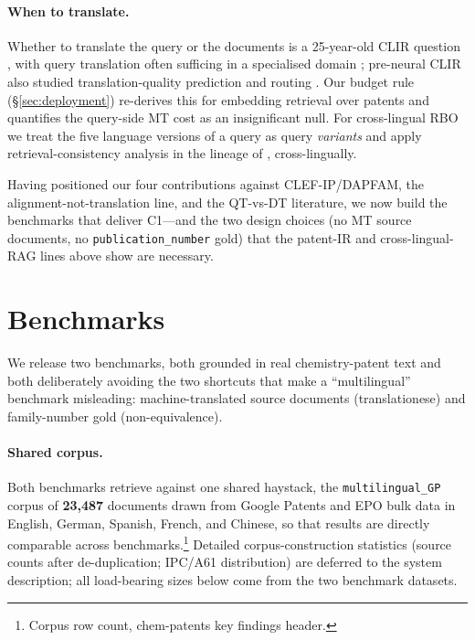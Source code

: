 \documentclass[11pt]{article}
\begin{document}
\paragraph{When to translate.}
Whether to translate the query or the documents is a 25-year-old CLIR question
\citep{oard1998,salehpecina2020}, with query translation often sufficing in a
specialised domain \citep{salehpecina2020}; pre-neural CLIR also studied
translation-quality prediction and routing \citep{kishida2008}. Our budget rule
(\S\ref{sec:deployment}) re-derives this for embedding retrieval over patents
and quantifies the query-side MT cost as an insignificant null. For
cross-lingual RBO we treat the five language versions of a query as query
\emph{variants} and apply retrieval-consistency analysis in the lineage of
\citet{bailey2017consistency}, cross-lingually.

Having positioned our four contributions against CLEF-IP/DAPFAM, the
alignment-not-translation line, and the QT-vs-DT literature, we now build the
benchmarks that deliver C1---and the two design choices (no MT source
documents, no \texttt{publication\_number} gold) that the patent-IR and
cross-lingual-RAG lines above show are necessary.

\section{Benchmarks}
\label{sec:benchmarks}

We release two benchmarks, both grounded in real chemistry-patent text and both
deliberately avoiding the two shortcuts that make a ``multilingual'' benchmark
misleading: machine-translated source documents (translationese) and
family-number gold (non-equivalence).

\paragraph{Shared corpus.}
Both benchmarks retrieve against one shared haystack, the
\texttt{multilingual\_GP} corpus of \textbf{23{,}487} documents drawn from
Google Patents and EPO bulk data in English, German, Spanish, French, and
Chinese, so that results are directly comparable across benchmarks.\footnote{%
Corpus row count, chem-patents key findings header.} Detailed
corpus-construction statistics (source counts after de-duplication; IPC/A61
distribution) are deferred to the system description; all load-bearing sizes
below come from the two benchmark datasets.
\end{document}
